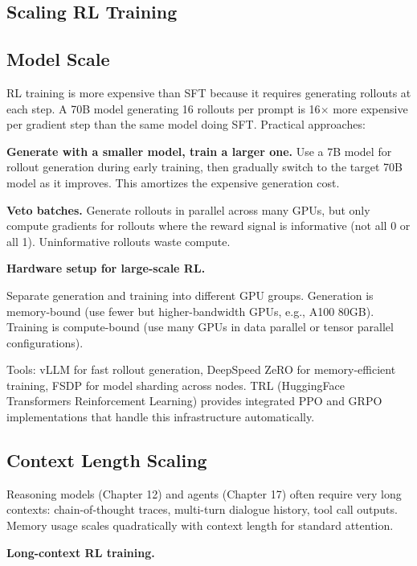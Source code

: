 \begin{chapterenv}
\section{Scaling RL Training}

\subsection{Model Scale}

RL training is more expensive than SFT because it requires generating rollouts at each step. A 70B model generating 16 rollouts per prompt is 16$\times$ more expensive per gradient step than the same model doing SFT. Practical approaches:

\textbf{Generate with a smaller model, train a larger one.} Use a 7B model for rollout generation during early training, then gradually switch to the target 70B model as it improves. This amortizes the expensive generation cost.

\textbf{Veto batches.} Generate rollouts in parallel across many GPUs, but only compute gradients for rollouts where the reward signal is informative (not all 0 or all 1). Uninformative rollouts waste compute.

\begin{tipbox}
\textbf{Hardware setup for large-scale RL.}

Separate generation and training into different GPU groups. Generation is memory-bound (use fewer but higher-bandwidth GPUs, e.g., A100 80GB). Training is compute-bound (use many GPUs in data parallel or tensor parallel configurations).

Tools: vLLM for fast rollout generation, DeepSpeed ZeRO for memory-efficient training, FSDP for model sharding across nodes. TRL (HuggingFace Transformers Reinforcement Learning) provides integrated PPO and GRPO implementations that handle this infrastructure automatically.
\end{tipbox}

\subsection{Context Length Scaling}

Reasoning models (Chapter 12) and agents (Chapter 17) often require very long contexts: chain-of-thought traces, multi-turn dialogue history, tool call outputs. Memory usage scales quadratically with context length for standard attention.

\begin{infobox}
\textbf{Long-context RL training.}


\end{infobox}
\end{chapterenv}
